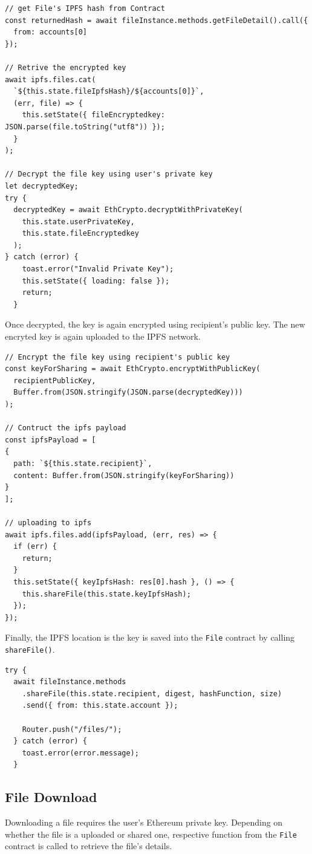 \documentclass[]{article}
\begin{document}
\begin{verbatim}
// get File's IPFS hash from Contract
const returnedHash = await fileInstance.methods.getFileDetail().call({
  from: accounts[0]
});

// Retrive the encrypted key
await ipfs.files.cat(
  `${this.state.fileIpfsHash}/${accounts[0]}`,
  (err, file) => {
    this.setState({ fileEncryptedkey: JSON.parse(file.toString("utf8")) });
  }
);

// Decrypt the file key using user's private key
let decryptedKey;
try {
  decryptedKey = await EthCrypto.decryptWithPrivateKey(
    this.state.userPrivateKey,
    this.state.fileEncryptedkey
  );
} catch (error) {
    toast.error("Invalid Private Key");
    this.setState({ loading: false });
    return;
  }
\end{verbatim}

		Once decrypted, the key is again encrypted using recipient's public key. The new encryted key is again uploaded to the IPFS network.
		
\begin{verbatim}
// Encrypt the file key using recipient's public key
const keyForSharing = await EthCrypto.encryptWithPublicKey(
  recipientPublicKey,
  Buffer.from(JSON.stringify(JSON.parse(decryptedKey)))
);

// Contruct the ipfs payload
const ipfsPayload = [
{
  path: `${this.state.recipient}`,
  content: Buffer.from(JSON.stringify(keyForSharing))
}
];

// uploading to ipfs
await ipfs.files.add(ipfsPayload, (err, res) => {
  if (err) {
    return;
  }
  this.setState({ keyIpfsHash: res[0].hash }, () => {
    this.shareFile(this.state.keyIpfsHash);
  });
});
\end{verbatim}

		Finally, the IPFS location is the key is saved into the \texttt{File} contract by calling \texttt{shareFile()}.
		
\begin{verbatim}
try {
  await fileInstance.methods
    .shareFile(this.state.recipient, digest, hashFunction, size)
    .send({ from: this.state.account });

    Router.push("/files/");
  } catch (error) {
    toast.error(error.message);
  }
\end{verbatim}
		
		\newpage
		\subsection{File Download}
		Downloading a file requires the user's Ethereum private key. Depending on whether the file is a uploaded or shared one, respective function from the \texttt{File} contract is called to retrieve the file's details.
		
\end{document}
